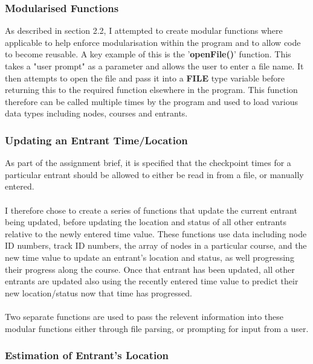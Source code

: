 \documentclass[12pt]{article}
\begin{document}
\subsubsection{Modularised Functions}

As described in section 2.2, I attempted to create modular functions where applicable to help enforce modularisation within the program and to allow code to become reusable. A key example of this is the '\textbf{openFile()}' function. This takes a "user prompt" as a parameter and allows the user to enter a file name. It then attempts to open the file and pass it into a \textbf{FILE} type variable before returning this to the required function elsewhere in the program. This function therefore can be called multiple times by the program and used to load various data types including nodes, courses and entrants.

\subsubsection{Updating an Entrant Time/Location}

As part of the assignment brief, it is specified that the checkpoint times for a particular entrant should be allowed to either be read in from a file, or manually entered. \\\\
I therefore chose to create a series of functions that update the current entrant being updated, before updating the location and status of all other entrants relative to the newly entered time value. These functions use data including node ID numbers, track ID numbers, the array of nodes in a particular course, and the new time value to update an entrant's location and status, as well progressing their progress along the course. Once that entrant has been updated, all other entrants are updated also using the recently entered time value to predict their new location/status now that time has progressed.\\\\
Two separate functions are used to pass the relevent information into these modular functions either through file parsing, or prompting for input from a user. 

\subsubsection{Estimation of Entrant's Location}
\end{document}
